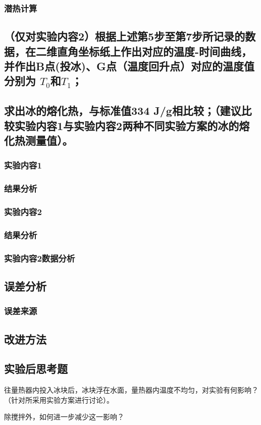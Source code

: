 \documentclass[dvipsnames, svgnames,a4paper,11pt]{article}
\newcommand{\recordblank}[1]{\par\vspace*{#1}\par}
\begin{document}
\subsubsection{潜热计算}
\recordblank{3.5cm}
\subsection{（仅对实验内容2）根据上述第5步至第7步所记录的数据，在二维直角坐标纸上作出对应的温度-时间曲线，并作出B点(投冰)、G点（温度回升点）对应的温度值分别为 $T_0$和$T_1$； }
\recordblank{3.5cm}
\subsection{求出冰的熔化热，与标准值334 J/g相比较；（建议比较实验内容1与实验内容2两种不同实验方案的冰的熔化热测量值）。}
\subsubsection{实验内容1}
\recordblank{3.5cm}
\subsubsection{结果分析}
\recordblank{3.5cm}
\subsubsection{实验内容2}
\recordblank{3.5cm}
\subsubsection{结果分析}
\recordblank{3.5cm}
\subsubsection{实验内容2数据分析}
\recordblank{3.5cm}
\subsection{误差分析}
\subsubsection{误差来源}
\recordblank{3.5cm}
\subsection{改进方法}
\recordblank{3.5cm}
\subsection{实验后思考题}

\begin{question}
往量热器内投入冰块后，冰块浮在水面，量热器内温度不均匀，对实验有何影响？（针对所采用实验方案进行讨论）。
\end{question}
\recordblank{4cm}

\begin{question}
除搅拌外，如何进一步减少这一影响？
\end{question}
\recordblank{4cm}

\appendix
\appendixpage
\addappheadtotoc


\recordblank{7cm}


\recordblank{7cm}



\recordblank{7cm}
\end{document}
